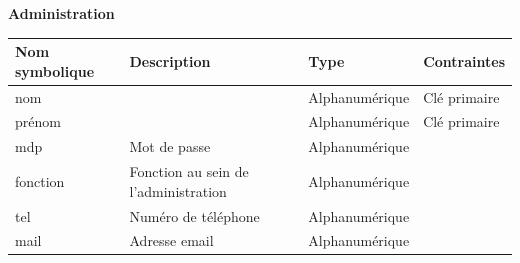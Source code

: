 \documentclass{scrreprt}
\begin{document}
\begin{flushleft}
\textbf{Administration}
\end{flushleft}

\begin{tabular}{|l|l|l|l|}
\hline
\textbf{Nom symbolique} & \textbf{Description} & \textbf{Type} & \textbf{Contraintes} \\
\hline
nom & & Alphanumérique & Clé primaire \\
prénom & & Alphanumérique & Clé primaire \\
mdp & Mot de passe & Alphanumérique & \\
fonction & Fonction au sein de l'administration & Alphanumérique & \\
tel & Numéro de téléphone & Alphanumérique & \\
mail & Adresse email & Alphanumérique & \\
\hline
\end{tabular}
\end{document}

